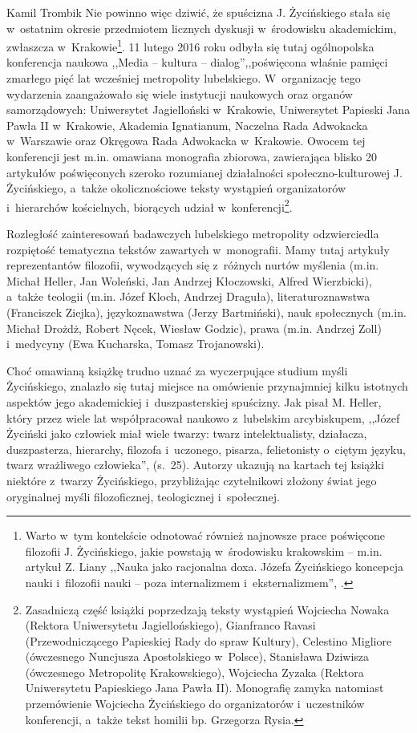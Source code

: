 \begin{recplenv}{Kamil Trombik}
Nie powinno więc dziwić, że spuścizna J. Życińskiego stała się w~ostatnim okresie przedmiotem licznych dyskusji w~środowisku akademickim, zwłaszcza w~Krakowie\footnote{Warto w~tym kontekście odnotować również najnowsze prace poświęcone filozofii J. Życińskiego, jakie powstają w~środowisku krakowskim -- m.in. artykuł Z. Liany ,,Nauka jako racjonalna doxa. Józefa Życińskiego koncepcja nauki i~filozofii nauki -- poza internalizmem i~eksternalizmem'',
\parencite[][]{liana_nauka_2019}.%
}. 11 lutego 2016 roku odbyła się tutaj ogólnopolska konferencja naukowa ,,Media -- kultura -- dialog'',,poświęcona właśnie pamięci zmarłego pięć lat wcześniej metropolity lubelskiego. W~organizację tego wydarzenia zaangażowało się wiele instytucji naukowych oraz organów samorządowych: Uniwersytet Jagielloński w~Krakowie, Uniwersytet Papieski Jana Pawła II w~Krakowie, Akademia Ignatianum, Naczelna Rada Adwokacka w~Warszawie oraz Okręgowa Rada Adwokacka w~Krakowie. Owocem tej konferencji jest m.in. omawiana monografia zbiorowa, zawierająca blisko 20 artykułów poświęconych szeroko rozumianej działalności społeczno-kulturowej J. Życińskiego, a~także okolicznościowe teksty wystąpień organizatorów i~hierarchów kościelnych, biorących udział w~konferencji\footnote{Zasadniczą część książki poprzedzają teksty wystąpień Wojciecha Nowaka (Rektora Uniwersytetu Jagiellońskiego), Gianfranco Ravasi (Przewodniczącego Papieskiej Rady do spraw Kultury), Celestino Migliore (ówczesnego Nuncjusza Apostolskiego w~Polsce), Stanisława Dziwisza (ówczesnego Metropolitę Krakowskiego), Wojciecha Zyzaka (Rektora Uniwersytetu Papieskiego Jana Pawła II). Monografię zamyka natomiast przemówienie Wojciecha Życińskiego do organizatorów i~uczestników konferencji, a~także tekst homilii bp. Grzegorza Rysia.}.

\enlargethispage{-.5\baselineskip}
Rozległość zainteresowań badawczych lubelskiego metropolity odzwierciedla rozpiętość tematyczna tekstów zawartych w~monografii. Mamy tutaj artykuły reprezentantów filozofii, wywodzących się z~różnych nurtów myślenia (m.in. Michał Heller, Jan Woleński, Jan Andrzej Kłoczowski, Alfred Wierzbicki), a~także teologii (m.in. Józef Kloch, Andrzej Draguła), literaturoznawstwa (Franciszek Ziejka), językoznawstwa (Jerzy Bartmiński), nauk społecznych (m.in. Michał Drożdż, Robert Nęcek, Wiesław Godzic), prawa (m.in. Andrzej Zoll) i~medycyny (Ewa Kucharska, Tomasz Trojanowski).

Choć omawianą książkę trudno uznać za wyczerpujące studium myśli Życińskiego, znalazło się tutaj miejsce na omówienie przynajmniej kilku istotnych aspektów jego akademickiej i~duszpasterskiej spuścizny. Jak pisał M. Heller, który przez wiele lat współpracował naukowo z~lubelskim arcybiskupem, ,,Józef Życiński jako człowiek miał wiele twarzy: twarz intelektualisty, działacza, duszpasterza, hierarchy, filozofa i~uczonego, pisarza, felietonisty o~ciętym języku, twarz wrażliwego człowieka'', (s.~25). Autorzy ukazują na kartach tej książki niektóre z~twarzy Życińskiego, przybliżając czytelnikowi złożony świat jego oryginalnej myśli filozoficznej, teologicznej i~społecznej.


\end{recplenv}
